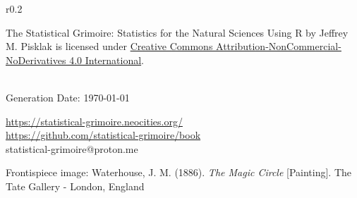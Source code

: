 \vspace*{\fill}

\setlength{\intextsep}{1pt}%
\setlength{\columnsep}{8pt}%
\begin{wrapfigure}{r}{0.2\textwidth}
\href{https://creativecommons.org/licenses/by-nc-nd/4.0/}{}
\end{wrapfigure}

{
\noindent
The Statistical Grimoire: Statistics for the Natural Sciences Using R by \mbox{Jeffrey} M. Pisklak is licensed under \href{https://creativecommons.org/licenses/by-nc-nd/4.0/}{Creative Commons Attribution-NonCommercial-NoDerivatives 4.0 International}.

\noindent
\luatexbanner \\
Generation Date: \today{}



\noindent
{} \url{https://statistical-grimoire.neocities.org/} \\
 \url{https://github.com/statistical-grimoire/book} \\
 statistical-grimoire@proton.me


\noindent
Frontispiece image: Waterhouse, J. M. (1886). \textit{The Magic Circle} [Painting]. The Tate Gallery - London, England
}


